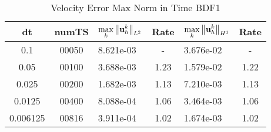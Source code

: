 \documentclass[letterpaper]{erdc}
\begin{document}
%

\begin{table}[h!]
  \begin{center}
    \caption{Velocity Error Max Norm in Time BDF1}
    \begin{tabular}{c|c|l|c|l|c}
      dt & numTS &  $\displaystyle\max_{k} \left\|\textbf{u}^{k}_{h}\right\|_{L^2}$ &  Rate  &  $\displaystyle\max_{k} \left\|\textbf{u}^{k}_{h}\right\|_{H^1}$ &  Rate\\
      \hline
      0.1     & 00050 &  8.621e-03 &  -  &  3.676e-02 &  -\\
      0.05    & 00100 &  3.688e-03 &  1.23  &  1.579e-02 &  1.22\\
      0.025   & 00200 &  1.682e-03 &  1.13  &  7.210e-03 &  1.13\\
      0.0125  & 00400 &  8.088e-04 &  1.06  &  3.464e-03 &  1.06\\
      0.006125 & 00816 &  3.911e-04 &  1.02  &  1.674e-03 &  1.02
    \end{tabular}
  \end{center}
\end{table}
\end{document}
